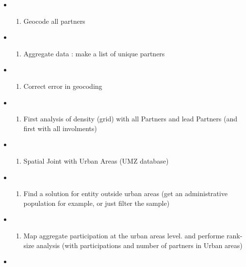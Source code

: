 \documentclass[]{article}
\providecommand{\tightlist}{%
  \setlength{\itemsep}{0pt}\setlength{\parskip}{0pt}}
\begin{document}
\begin{itemize}
\item
  \begin{enumerate}
  \def\labelenumi{(\arabic{enumi})}
  \tightlist
  \item
    Geocode all partners
  \end{enumerate}
\item
  \begin{enumerate}
  \def\labelenumi{(\arabic{enumi})}
  \setcounter{enumi}{1}
  \tightlist
  \item
    Aggregate data : make a list of unique partners
  \end{enumerate}
\item
  \begin{enumerate}
  \def\labelenumi{(\arabic{enumi})}
  \setcounter{enumi}{2}
  \tightlist
  \item
    Correct error in geocoding
  \end{enumerate}
\item
  \begin{enumerate}
  \def\labelenumi{(\arabic{enumi})}
  \setcounter{enumi}{3}
  \tightlist
  \item
    First analysis of density (grid) with all Partners and lead Partners
    (and first with all involments)
  \end{enumerate}
\item
  \begin{enumerate}
  \def\labelenumi{(\arabic{enumi})}
  \setcounter{enumi}{4}
  \tightlist
  \item
    Spatial Joint with Urban Areas (UMZ database)
  \end{enumerate}
\item
  \begin{enumerate}
  \def\labelenumi{(\arabic{enumi})}
  \setcounter{enumi}{5}
  \tightlist
  \item
    Find a solution for entity outside urban areas (get an
    administrative population for example, or just filter the sample)
  \end{enumerate}
\item
  \begin{enumerate}
  \def\labelenumi{(\arabic{enumi})}
  \setcounter{enumi}{6}
  \tightlist
  \item
    Map aggregate participation at the urban areas level. and performe
    rank-size analysis (with participations and number of partners in
    Urban areas)
  \end{enumerate}
\item

\end{itemize}
\end{document}
